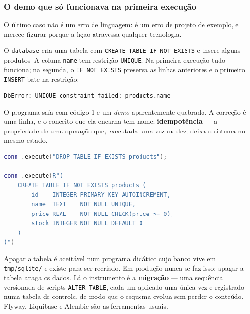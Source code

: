 \subsubsection{O demo que só funcionava na primeira execução}

O último caso não é um erro de linguagem: é um erro de projeto de exemplo, e
merece figurar porque a lição atravessa qualquer tecnologia.

O \texttt{database} cria uma tabela com \texttt{CREATE TABLE IF NOT EXISTS} e
insere alguns produtos. A coluna \texttt{name} tem restrição \texttt{UNIQUE}.
Na primeira execução tudo funciona; na segunda, o \texttt{IF NOT EXISTS}
preserva as linhas anteriores e o primeiro \texttt{INSERT} bate na restrição:

\begin{lstlisting}[style=bt, language=bash,
    caption={Saída de \texttt{src/database/} antes da correção, na segunda
             execução.}]
DbError: UNIQUE constraint failed: products.name
\end{lstlisting}

O programa saía com código 1 e um \emph{demo} aparentemente quebrado. A
correção é uma linha, e o conceito que ela encarna tem nome:
\textbf{idempotência} --- a propriedade de uma operação que, executada uma vez
ou dez, deixa o sistema no mesmo estado.

\begin{lstlisting}[style=bt, language=C++,
    caption={A linha que torna o \emph{demo} idempotente, em
             \texttt{src/database/main.cpp}.}]
conn_.execute("DROP TABLE IF EXISTS products");

conn_.execute(R"(
    CREATE TABLE IF NOT EXISTS products (
        id    INTEGER PRIMARY KEY AUTOINCREMENT,
        name  TEXT    NOT NULL UNIQUE,
        price REAL    NOT NULL CHECK(price >= 0),
        stock INTEGER NOT NULL DEFAULT 0
    )
)");
\end{lstlisting}

\begin{regra}
Apagar a tabela é aceitável num programa didático cujo banco vive em
\texttt{tmp/sqlite/} e existe para ser recriado. Em produção nunca se faz
isso: apagar a tabela apaga os dados. Lá o instrumento é a \textbf{migração}
--- uma sequência versionada de scripts \texttt{ALTER TABLE}, cada um aplicado
uma única vez e registrado numa tabela de controle, de modo que o esquema
evolua sem perder o conteúdo. Flyway, Liquibase e Alembic são as ferramentas
usuais.
\end{regra}

